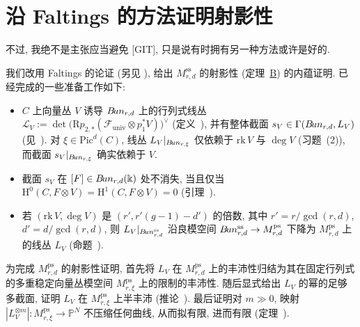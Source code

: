 \section{沿 Faltings 的方法证明射影性}\label{src:9.6}
\begin{epigraph}
不过, 我绝不是主张应当避免 [GIT], 只是说有时拥有另一种方法或许是好的.
\end{epigraph}
我们改用 Faltings 的论证 \cite{Fal93} (另见 \cite{ABB+22}), 给出 $M_{r,d}^{\mathrm{ss}}$ 的射影性 (定理~\hyperref[thm:B]{B}) 的内蕴证明. 已经完成的一些准备工作如下:
\begin{itemize}
\item $C$ 上向量丛 $V$ 诱导 $B\!un_{r,d}$ 上的行列式线丛 $\mathcal L_V:=\det\big(\mathrm Rp_{2,*}(\mathcal F_{\mathrm{univ}}\otimes p_1^*V)\big)^\vee$ (定义~), 并有整体截面 $s_V\in\Gamma(B\!un_{r,d},L_V)$ (见~). 对 $\xi\in\mathrm{Pic}^d(C)$, 线丛 $L_V|_{B\!un_{r,\xi}}$ 仅依赖于 $\mathrm{rk}\,V$ 与 $\deg V$ (习题~(2)), 而截面 $s_V|_{B\!un_{r,\xi}}$ 确实依赖于 $V$.
\item 截面 $s_V$ 在 $[F]\in B\!un_{r,d}(\Bbbk)$ 处不消失, 当且仅当 $\mathrm H^0(C,F\otimes V)=\mathrm H^1(C,F\otimes V)=0$ (引理~).
\item 若 $(\mathrm{rk}\,V,\deg V)$ 是 $(r',r'(g-1)-d')$ 的倍数, 其中 $r'=r/\gcd(r,d)$, $d'=d/\gcd(r,d)$, 则 $L_V|_{B\!un_{r,d}^{\mathrm{ss}}}$ 沿良模空间 $B\!un_{r,d}^{\mathrm{ss}}\to M_{r,d}^{\mathrm{ps}}$ 下降为 $M_{r,d}^{\mathrm{ps}}$ 上的线丛 $L_V$ (命题~).
\end{itemize}
为完成 $M_{r,d}^{\mathrm{ps}}$ 的射影性证明, 首先将 $L_V$ 在 $M_{r,d}^{\mathrm{ps}}$ 上的丰沛性归结为其在固定行列式的多重稳定向量丛模空间 $M_{r,\xi}^{\mathrm{ps}}$ 上的限制的丰沛性. 随后显式给出 $L_V$ 的幂的足够多截面, 证明 $L_V$ 在 $M_{r,\xi}^{\mathrm{ps}}$ 上半丰沛 (推论~). 最后证明对 $m\gg0$, 映射 $|L_V^{\otimes m}|:M_{r,\xi}^{\mathrm{ps}}\to\mathbb P^N$ 不压缩任何曲线, 从而拟有限, 进而有限 (定理~).

